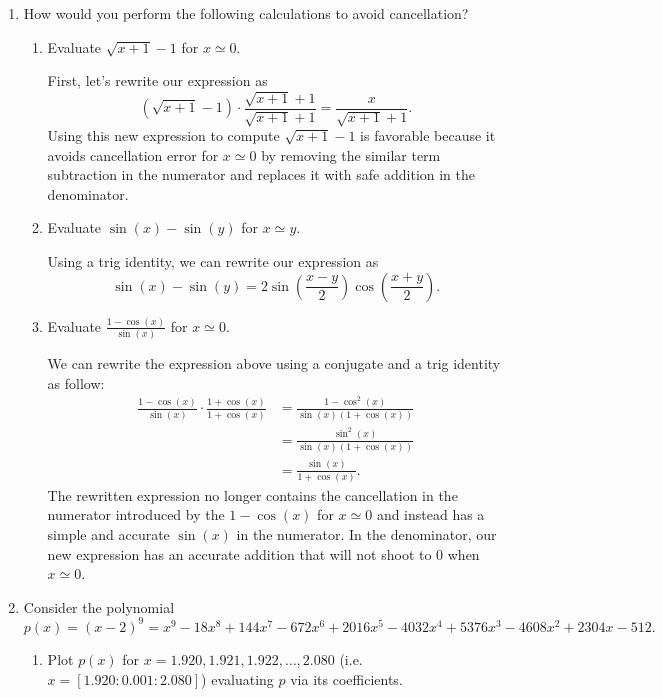 \documentclass[a4paper,10pt]{article}
\begin{document}
\begin{enumerate}[label = \arabic*.)]
    \item How would you perform the following calculations to avoid cancellation?
        \begin{enumerate}[label = \roman*.]
            \item Evaluate $\sqrt{x + 1} - 1$ for $x \simeq 0$.
            
            First, let's rewrite our expression as
            \[
                (\sqrt{x + 1} - 1) \cdot \frac{\sqrt{x + 1} + 1}{\sqrt{x + 1} + 1} = \frac{x}{\sqrt{x + 1} + 1}.
            \]
            Using this new expression to compute $\sqrt{x + 1} - 1$ is favorable because it avoids cancellation error for $x \simeq 0$ by removing the similar term subtraction in the numerator and replaces it with safe addition in the denominator.
            
            \item Evaluate $\sin(x) - \sin(y)$ for $x \simeq y$.
            
            Using a trig identity, we can rewrite our expression as
            \[
                \sin(x) - \sin(y) = 2 \sin\left(\frac{x - y}{2}\right) \cos\left( \frac{x + y}{2} \right).
            \]
            
            \item Evaluate $\frac{1 - \cos(x)}{\sin(x)}$ for $x \simeq 0$.
            
            We can rewrite the expression above using a conjugate and a trig identity as follow:
            \begin{align*}
                \frac{1 - \cos(x)}{\sin(x)} \cdot \frac{1 + \cos(x)}{1 + \cos(x)} &= \frac{1 - \cos^2(x)}{\sin(x) (1 + \cos(x))} \\
                &= \frac{\sin^2(x)}{\sin(x) (1 + \cos(x))} \\
                &= \frac{\sin(x)}{1 + \cos(x)}.
            \end{align*}
            The rewritten expression no longer contains the cancellation in the numerator introduced by the $1 - \cos(x)$ for $x \simeq 0$ and instead has a simple and accurate $\sin(x)$ in the numerator. In the denominator, our new expression has an accurate addition that will not shoot to 0 when $x \simeq 0$.
            
        \end{enumerate}
    
    \newpage
    \item Consider the polynomial
        \[
            p(x) = (x - 2)^9  = x^9 - 18x^8 + 144x^7 - 672x^6 + 2016x^5 - 4032x^4 + 5376x^3 - 4608x^2 + 2304x - 512.
        \]
        \begin{enumerate}[label = \roman*.]
            \item Plot $p(x)$ for $x = 1.920, 1.921, 1.922, \ldots, 2.080$ (i.e. $x = [1.920 : 0.001 : 2.080]$) evaluating $p$ via its coefficients.
            

\end{enumerate}
\end{enumerate}
\end{document}
